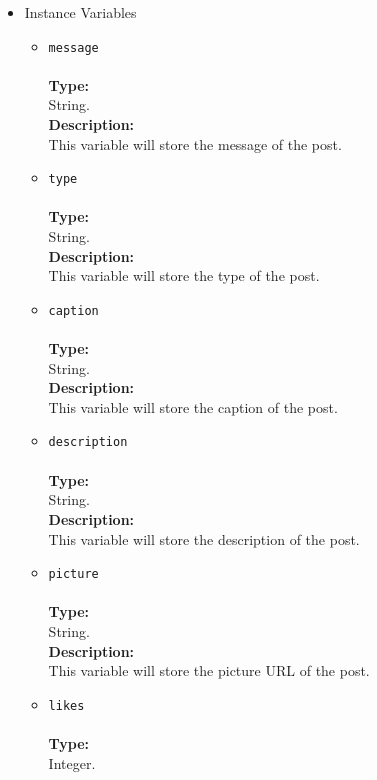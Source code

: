 \begin{itemize}
\begin{itemize}

\item Instance Variables
\label{sec-1-4-2-4-1}%
\begin{itemize}
\item \verb~message~\\\\
\textbf{Type:}\\
     String.\\

     \textbf{Description:}\\
     This variable will store the message of the post.\\
\item \verb~type~\\\\
\textbf{Type:}\\
     String.\\

     \textbf{Description:}\\
     This variable will store the type of the post.\\
\item \verb~caption~\\\\
\textbf{Type:}\\
     String.\\

     \textbf{Description:}\\
     This variable will store the caption of the post.\\
\item \verb~description~\\\\
\textbf{Type:}\\
     String.\\

     \textbf{Description:}\\
     This variable will store the description of the post.\\
\item \verb~picture~\\\\
\textbf{Type:}\\
     String.\\

     \textbf{Description:}\\
     This variable will store the picture URL of the post.\\
\item \verb~likes~\\\\
\textbf{Type:}\\
     Integer.\\


\end{itemize}
\end{itemize}
\end{itemize}
